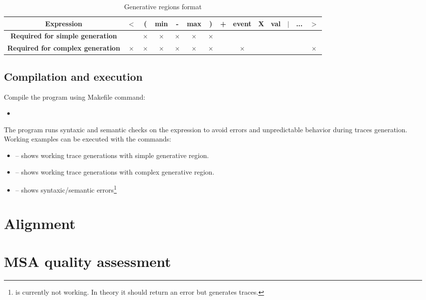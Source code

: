 \documentclass[12pt,a4paper]{article}
\begin{document}
\begin{table}[H]
	\begin{center}
		\caption{Generative regions format}
		\begin{tabular}{|c|c|c|c|c|c|c|c|c|c|c|c|c|c|}
			\hline
			\textbf{Expression} & $<$ & ( & min & - & max & ) & + & event & X & val & $|$ & ... & $>$ \\
			\hline
			\textbf{Required for simple generation} && $\times$ & $\times$ & $\times$ & $\times$ & $\times$ &&&&&&& \\
			\hline
			\textbf{Required for complex generation} & $\times$ & $\times$ & $\times$ & $\times$ & $\times$ & $\times$ && $\times$ &&&&& $\times$ \\
			\hline
		\end{tabular}
	\end{center}
\end{table}

\subsection{Compilation and execution}

Compile the program using Makefile command:
\begin{itemize}
	\item {}
\end{itemize}

The program runs syntaxic and semantic checks on the expression to avoid errors and unpredictable behavior during traces generation. Working examples can be executed with the commands:
\begin{itemize}
	\item {} -- shows working trace generations with simple generative region.
	\item {} -- shows working trace generations with complex generative region.
	\item {} -- shows syntaxic/semantic errors\footnote{{\selectfont{make test\_semantic4}} is currently not working. In theory it should return an error but generates traces.}
\end{itemize}

\section{Alignment}



\section{MSA quality assessment}
\end{document}
